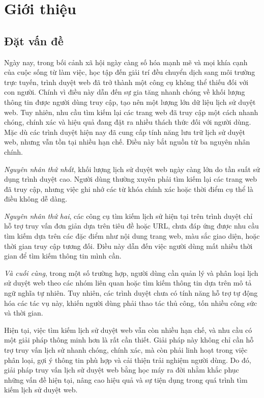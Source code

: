 \changefontsizes[16pt]{13pt}
\pagestyle{plain}
\chapter{Giới thiệu}
\label{chap:intro}

\section{Đặt vấn đề}

Ngày nay, trong bối cảnh xã hội ngày càng số hóa mạnh mẽ và mọi khía cạnh của cuộc sống từ làm việc, học tập đến giải trí đều chuyển dịch sang môi trường trực tuyến, trình duyệt web đã trở thành một công cụ không thể thiếu đối với con người. Chính vì điều này dẫn đến sự gia tăng nhanh chóng về khối lượng thông tin được người dùng truy cập, tạo nên một lượng lớn dữ liệu lịch sử duyệt web. Tuy nhiên, nhu cầu tìm kiếm lại các trang web đã truy cập một cách nhanh chóng, chính xác và hiệu quả đang đặt ra nhiều thách thức đối với người dùng. Mặc dù các trình duyệt hiện nay đã cung cấp tính năng lưu trữ lịch sử duyệt web, nhưng vẫn tồn tại nhiều hạn chế. Điều này bắt nguồn từ ba nguyên nhân chính.

\textit{Nguyên nhân thứ nhất}, khối lượng lịch sử duyệt web ngày càng lớn do tần suất sử dụng trình duyệt cao. Người dùng thường xuyên phải tìm kiếm lại các trang web đã truy cập, nhưng việc ghi nhớ các từ khóa chính xác hoặc thời điểm cụ thể là điều không dễ dàng. 

\textit{Nguyên nhân thứ hai}, các công cụ tìm kiếm lịch sử hiện tại trên trình duyệt chỉ hỗ trợ truy vấn đơn giản dựa trên tiêu đề hoặc URL, chưa đáp ứng được nhu cầu tìm kiếm dựa trên các đặc điểm như nội dung trang web, màu sắc giao diện, hoặc thời gian truy cập tương đối. Điều này dẫn đến việc người dùng mất nhiều thời gian để tìm kiếm thông tin mình cần.

\textit{Và cuối cùng}, trong một số trường hợp, người dùng cần quản lý và phân loại lịch sử duyệt web theo các nhóm liên quan hoặc tìm kiếm thông tin dựa trên mô tả ngữ nghĩa tự nhiên. Tuy nhiên, các trình duyệt chưa có tính năng hỗ trợ tự động hóa các tác vụ này, khiến người dùng phải thao tác thủ công, tốn nhiều công sức và thời gian. 

Hiện tại, việc tìm kiếm lịch sử duyệt web vẫn còn nhiều hạn chế, và nhu cầu có một giải pháp thông minh hơn là rất cần thiết. Giải pháp này không chỉ cần hỗ trợ truy vấn lịch sử nhanh chóng, chính xác, mà còn phải linh hoạt trong việc phân loại, gợi ý thông tin phù hợp và cải thiện trải nghiệm người dùng. Do đó, giải pháp truy vấn lịch sử duyệt web bằng học máy ra đời nhằm khắc phục những vấn đề hiện tại, nâng cao hiệu quả và sự tiện dụng trong quá trình tìm kiếm lịch sử duyệt web.


